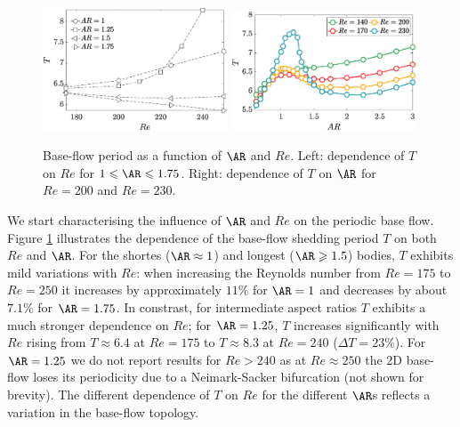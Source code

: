 \begin{figure}
  \centering
  \includegraphics[width=0.49\textwidth]{./fig/AR1s/T_Re.eps}
  \includegraphics[width=0.49\textwidth]{./fig/AR1s/T_AR.eps}
  \caption{Base-flow period as a function of $\AR$ and $Re$. Left: dependence of $T$ on $Re$ for $1 \le \AR \le 1.75$. Right: dependence of $T$ on $\AR$ for $Re=200$ and $Re=230$.}
  \label{fig:T_Re_small}
\end{figure}
%
We start characterising the influence of $\AR$ and $Re$ on the periodic base flow. Figure \ref{fig:T_Re_small} illustrates the dependence of the base-flow shedding period $T$ on both $Re$ and $\AR$. For the shortes ($\AR \approx 1$) and longest ($\AR \ge 1.5$) bodies, $T$ exhibits mild variations with $Re$: when increasing the Reynolds number from $Re=175$ to $Re=250$ it increases by approximately $11\%$ for $\AR=1$ and decreases by about $7.1\%$ for $\AR=1.75$. In constrast, for intermediate aspect ratios $T$ exhibits a much stronger dependence on $Re$; for $\AR=1.25$, $T$ increases significantly with $Re$ rising from $T \approx 6.4$ at $Re = 175$ to $T \approx 8.3$ at $Re=240$ ($\Delta T = 23\%$). For $\AR=1.25$ we do not report results for $Re > 240$ as at $Re \approx 250$ the 2D base-flow loses its periodicity due to a Neimark-Sacker bifurcation (not shown for brevity). The different dependence of $T$ on $Re$ for the different $\AR$s reflects a variation in the base-flow topology.

